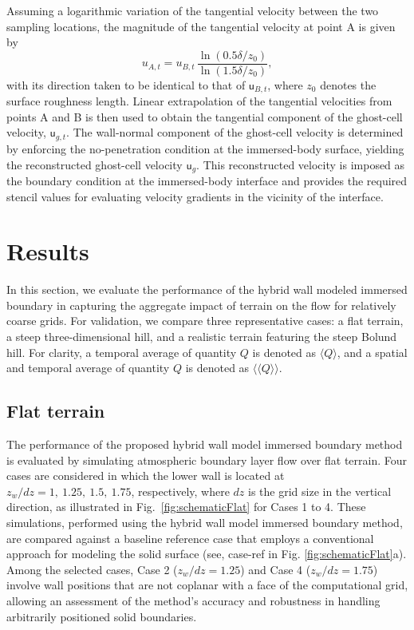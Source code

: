 \documentclass[%
superscriptaddress,
 amsmath,amssymb,
pra,
showkeys,
]{revtex4-2}
\begin{document}
Assuming a logarithmic variation of the tangential velocity between the two sampling locations, the magnitude of the tangential velocity at point A is given by
\begin{equation}
u_{A,t}
=
u_{B,t}\,
\frac{\ln(0.5\delta/z_0)}{\ln(1.5\delta/z_0)},
\end{equation}
with its direction taken to be identical to that of $\boldsymbol{\mathsf{u}}_{B,t}$, where $z_0$ denotes the surface roughness length. Linear extrapolation of the tangential velocities from points A and B is then used to obtain the tangential component of the ghost-cell velocity, $\boldsymbol{\mathsf{u}}_{g,t}$. The wall-normal component of the ghost-cell velocity is determined by enforcing the no-penetration condition at the immersed-body surface, yielding the reconstructed ghost-cell velocity $\boldsymbol{\mathsf{u}}_g$. This reconstructed velocity is imposed as the boundary condition at the immersed-body interface and provides the required stencil values for evaluating velocity gradients in the vicinity of the interface.

\section{\label{sec:results}Results}
In this section, we evaluate the performance of the hybrid wall modeled immersed boundary in capturing the aggregate impact of terrain on the flow for relatively coarse grids. For validation, we compare three representative cases: a flat terrain, a steep three-dimensional hill, and a realistic terrain featuring the steep Bolund hill. For clarity, a temporal average of quantity $Q$ is denoted as $\langle Q \rangle$, and a spatial and temporal average of quantity $Q$ is denoted as $\langle \!\langle Q \rangle \!\rangle $.

\subsection{Flat terrain}
The performance of the proposed hybrid wall model immersed boundary method is evaluated by simulating atmospheric boundary layer flow over flat terrain. Four cases are considered in which the lower wall is located at $z_w/dz = 1,\ 1.25,\ 1.5,\ 1.75$, respectively, where $dz$ is the grid size in the vertical direction, as illustrated in Fig.~\ref{fig:schematicFlat} for Cases 1 to 4. These simulations, performed using the hybrid wall model immersed boundary method, are compared against a baseline reference case that employs a conventional approach for modeling the solid surface (see, case-ref in Fig. \ref{fig:schematicFlat}a). Among the selected cases, Case 2 ($z_w/dz = 1.25$) and Case 4 ($z_w/dz = 1.75$) involve wall positions that are not coplanar with a face of the computational grid, allowing an assessment of the method’s accuracy and robustness in handling arbitrarily positioned solid boundaries.
\end{document}
